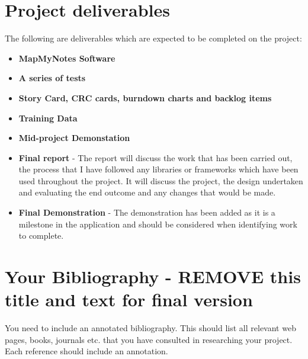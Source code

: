 \documentclass[11pt,fleqn,twoside]{article}
\begin{document}
\section{Project deliverables}
The following are deliverables which are expected to be completed on the project:
\begin{itemize}

  \item \textbf{MapMyNotes Software}

  \item \textbf{A series of tests}

  \item \textbf{Story Card, CRC cards, burndown charts and backlog items}

  \item \textbf{Training Data}

  \item \textbf{Mid-project Demonstation}

  \item \textbf{Final report} - The report will discuss the work that has been carried out, the process that I have followed any libraries or frameworks which have been used throughout the project. It will discuss the project, the design undertaken and evaluating the end outcome and any changes that would be made.

  \item \textbf{Final Demonstration} - The demonstration has been added as it is a milestone in the application and should be considered when identifying work to complete. 

\end{itemize}

%
%
\section*{Your Bibliography - REMOVE this title and text for final version}
%
You need to include an annotated bibliography. This should list all relevant web pages, books, journals etc. that you have consulted in researching your project. Each reference should include an annotation.
\end{document}
